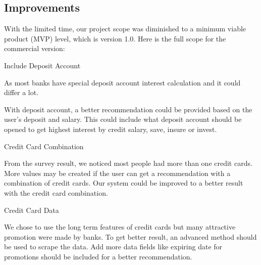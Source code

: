 \subsection{Improvements} %
\label{sub:improvements}

With the limited time, our project scope was diminished to a minimum viable product (MVP) level, which is version 1.0. Here is the full scope for the commercial version:

\begin{description}[align=left]
	\item [version 1.1] Include Deposit Account

		As most banks have special deposit account interest calculation and it could differ a lot.

		With deposit account, a better recommendation could be provided based on the user's deposit and salary. This could include what deposit account should be opened to get highest interest by credit salary, save, insure or invest.


	\item [version 1.2] Credit Card Combination

		From the survey result, we noticed most people had more than one credit cards. More values may be created if the user can get a recommendation with a combination of credit cards. Our system could be improved to a better result with the credit card combination.

	\item [version 1.3] Credit Card Data

		We chose to use the long term features of credit cards but many attractive promotion were made by banks. To get better result, an advanced method should be used to scrape the data. Add more data fields like expiring date for promotions should be included for a better recommendation.



\end{description}
